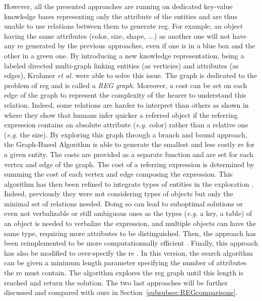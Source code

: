 \documentclass[a4paper,11pt,twoside]{StyleThese}
\begin{document}
However, all the presented approaches are running on dedicated key-value knowledge bases representing only the attribute of the entities and are thus unable to use relations between them to generate \acrshort{reg}. For example, an object having the same attributes (color, size, shape, ...) as another one will not have any \acrshort{re} generated by the previous approaches, even if one is in a blue box and the other in a green one. By introducing a new knowledge representation, being a labeled directed multi-graph linking entities (as verticies) and attributes (as edges), Krahmer \textit{et al.} were able to solve this issue. The graph is dedicated to the problem of \acrshort{reg} and is called a \textit{REG graph}. Moreover, a cost can be set on each edge of the graph to represent the complexity of the hearer to understand this relation. Indeed, some relations are harder to interpret than others as shown in \cite{belke2002tracking} where they show that humans infer quicker a referred object if the referring expression contains an absolute attribute (\textit{e.g.} color) rather than a relative one (\textit{e.g.} the size). By exploring this graph through a branch and bound approach, the Graph-Based Algorithm \cite{krahmer2003graph} is able to generate the smallest and less costly \acrshort{re} for a given entity. The costs are provided as a separate function and are set for each vertex and edge of the graph. The cost of a referring expression is determined by summing the cost of each vertex and edge composing the expression. This algorithm has then been refined to integrate types of entities in the exploration \cite{krahmer2012computational}. Indeed, previously they were not considering types of objects but only the minimal set of relations needed. Doing so can lead to suboptimal solutions or even not verbalizable or still ambiguous ones as the types (\textit{e.g.} a key, a table) of an object is needed to verbalize the expression, and multiple objects can have the same type, requiring more attributes to be distinguished. Then, the approach has been reimplemented to be more computationnally efficient \cite{li2017automatically}. Finally, this approach has also be modified to over-specify the \acrshort{re} \cite{viethen2013graphs}. In this version, the search algorithm can be given a minimum length parameter specifying the number of attributes the \acrshort{re} must contain. The algorithm explores the \acrshort{reg} graph until this length is reached and return the solution. The two last approaches will be further discussed and compared with ours in Section~\ref{subsubsec:REGcomparisons}.
\end{document}
